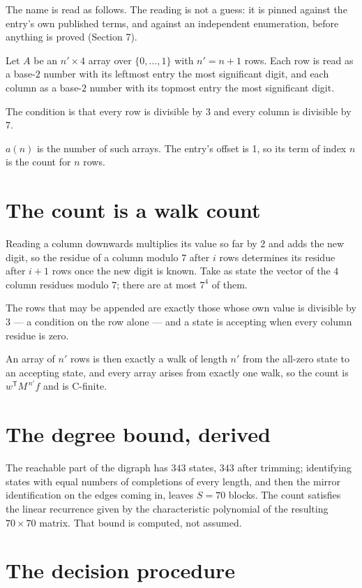 \documentclass[11pt]{article}
\theoremstyle{definition}
\begin{document}
The name is read as follows. The reading is not a guess: it is pinned against the entry's own published terms, and against an independent enumeration, before anything is proved (Section 7).

Let $A$ be an $n' \times 4$ array over $\{0,\dots,1\}$ with $n' = n + 1$ rows. Each row is read as a base-$2$ number with its leftmost entry the most significant digit, and each column as a base-$2$ number with its topmost entry the most significant digit.

The condition is that every row is divisible by $3$ and every column is divisible by $7$.

$a(n)$ is the number of such arrays. The entry's offset is 1, so its term of index $n$ is the count for $n$ rows.

\section{The count is a walk count}

Reading a column downwards multiplies its value so far by $2$ and adds the new digit, so the residue of a column modulo $7$ after $i$ rows determines its residue after $i+1$ rows once the new digit is known. Take as state the vector of the $4$ column residues modulo $7$; there are at most $7^{4}$ of them.

The rows that may be appended are exactly those whose own value is divisible by $3$ --- a condition on the row alone --- and a state is accepting when every column residue is zero.

An array of $n'$ rows is then exactly a walk of length $n'$ from the all-zero state to an accepting state, and every array arises from exactly one walk, so the count is $w^{\mathsf T}M^{\,n'}f$ and is C-finite.

\section{The degree bound, derived}

The reachable part of the digraph has $343$ states, $343$ after trimming; identifying states with equal numbers of completions of every length, and then the mirror identification on the edges coming in, leaves $S = 70$ blocks. The count satisfies the linear recurrence given by the characteristic polynomial of the resulting $70\times70$ matrix. That bound is computed, not assumed.

\section{The decision procedure}
\end{document}
